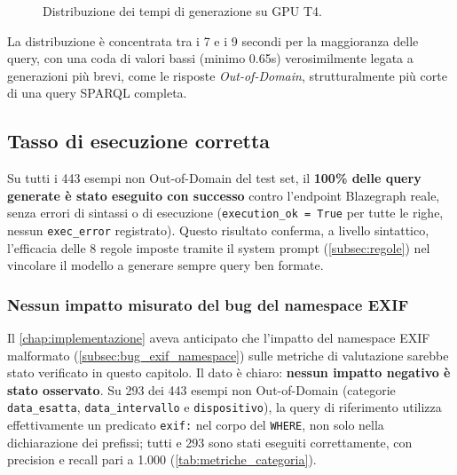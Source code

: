 \documentclass[12pt,a4paper,oneside]{book}
\newcommand{\code}[1]{\colorbox{light-gray}{\texttt{#1}}}
\begin{document}
\begin{figure}[htbp]
    \centering
    \caption{Distribuzione dei tempi di generazione su GPU T4.}\label{fig:generation_time_hist}
\end{figure}

La distribuzione è concentrata tra i 7 e i 9 secondi per la maggioranza delle query, con una coda di valori bassi (minimo 0.65s) verosimilmente legata a generazioni più brevi, come le risposte \textit{Out-of-Domain}, strutturalmente più corte di una query SPARQL completa.

\subsection{Tasso di esecuzione corretta}\label{subsec:tasso_esecuzione}

Su tutti i 443 esempi non Out-of-Domain del test set, il \textbf{100\% delle query generate è stato eseguito con successo} contro l'endpoint Blazegraph reale, senza errori di sintassi o di esecuzione (\code{execution\_ok = True} per tutte le righe, nessun \code{exec\_error} registrato). Questo risultato conferma, a livello sintattico, l'efficacia delle 8 regole imposte tramite il system prompt (\cref{subsec:regole}) nel vincolare il modello a generare sempre query ben formate.

\subsubsection{Nessun impatto misurato del bug del namespace EXIF}

Il \cref{chap:implementazione} aveva anticipato che l'impatto del namespace EXIF malformato (\cref{subsec:bug_exif_namespace}) sulle metriche di valutazione sarebbe stato verificato in questo capitolo. Il dato è chiaro: \textbf{nessun impatto negativo è stato osservato}. Su 293 dei 443 esempi non Out-of-Domain (categorie \code{data\_esatta}, \code{data\_intervallo} e \code{dispositivo}), la query di riferimento utilizza effettivamente un predicato \code{exif:} nel corpo del \code{WHERE}, non solo nella dichiarazione dei prefissi; tutti e 293 sono stati eseguiti correttamente, con precision e recall pari a 1.000 (\cref{tab:metriche_categoria}).
\end{document}
